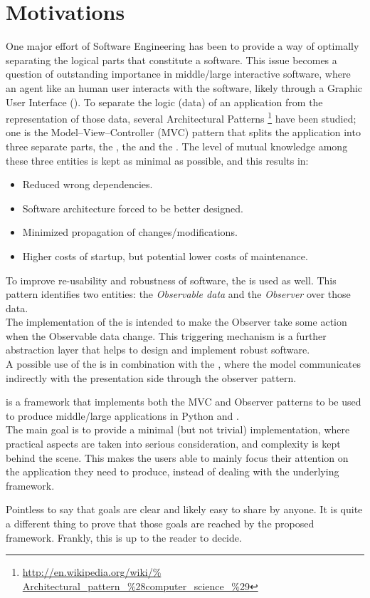 \section{Motivations}
\label{MOT}

One major effort of Software Engineering has been to provide a way of
optimally separating the logical parts that constitute a software.
This issue becomes a question of outstanding importance in
middle/large interactive software, where an agent like an human user
interacts with the software, likely through a Graphic User Interface
(\gui).
To separate the logic (data) of an application from the representation
of those data, several Architectural Patterns
\footnote{\url{http://en.wikipedia.org/wiki/%
    Architectural_pattern_\%28computer_science_\%29}} 
have been studied; one is the Model--View--Controller (MVC) pattern
that splits the application into three separate parts, the ,
the  and the . The level of mutual knowledge
among these three entities is kept as minimal as possible, and this
results in:

\begin{itemize}
\item Reduced wrong dependencies.
\item Software architecture forced to be better designed.
\item Minimized propagation of changes/modifications.
\item Higher costs of startup, but potential lower costs of
  maintenance.
\end{itemize}


To improve re-usability and robustness of software, the \obs is used
as well. This pattern identifies two entities: the
\emph{Observable data} and the \emph{Observer} over those data.\\
The implementation of the \obs is intended to make the Observer take
some action when the Observable data change. This triggering mechanism
is a further abstraction layer that helps to
design and implement robust software.\\
A possible use of the \obs is in combination with the \mvc, where the
model communicates indirectly with the presentation side through the
observer pattern.

\smallskip

\pygtkmvc is a framework that implements both the MVC and Observer
patterns to be used to produce middle/large applications in Python and
\pygtk. \\
The main goal is to provide a minimal (but not trivial)
implementation, where practical aspects are taken into serious
consideration, and complexity is kept behind the scene. This makes the
users able to mainly focus their attention on the application they
need to produce, instead of dealing with the underlying framework.

\bigskip Pointless to say that goals are clear and likely easy to
share by anyone. It is quite a different thing to prove that those
goals are reached by the proposed framework. Frankly, this is up to
the reader to decide.

